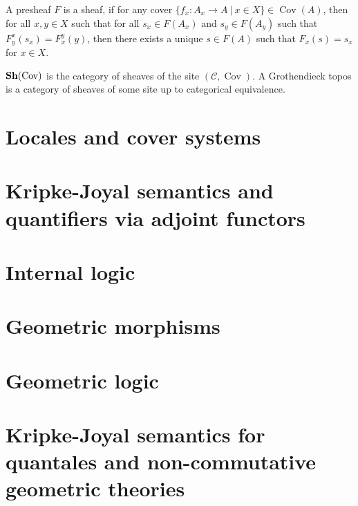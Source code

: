 \documentclass[a4paper]{article}
\theoremstyle{defin}
\theoremstyle{theorem}
\theoremstyle{claim}
\theoremstyle{prop}
\theoremstyle{lemma}
\theoremstyle{fact}
\theoremstyle{ex}
\theoremstyle{col}
\begin{document}
A presheaf $F$ is a sheaf, if for any cover $\{ f_x : A_x \to A \: | \: x \in X \} \in \operatorname{Cov}(A)$, then for all $x, y \in X$ such that for all $s_x \in F(A_x)$ and $s_y \in F(A_y)$ such that $F^x_y(s_x) = F^y_x(y)$, then there exists a unique $s \in F(A)$ such that $F_x(s) = s_x$ for $x \in X$.

${\bf Sh}(\operatorname{Cov})$ is the category of sheaves of the site $(\mathcal{C}, \operatorname{Cov})$. A Grothendieck topos is a category of sheaves of some site up to categorical equivalence.

\section{Locales and cover systems}

\section{Kripke-Joyal semantics and quantifiers via adjoint functors}

\section{Internal logic}

\section{Geometric morphisms}

\section{Geometric logic}

\section{Kripke-Joyal semantics for quantales and non-commutative geometric theories}
\end{document}
